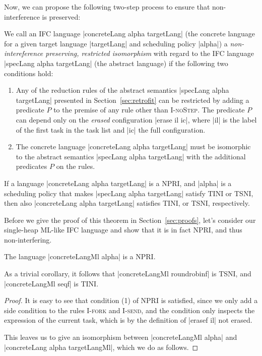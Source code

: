 Now, we can propose the following two-step process to ensure that
non-interference is preserved:
\begin{definition}
  We call an IFC language
  |concreteLang alpha targetLang| (the concrete language for a given
  target language |targetLang| and scheduling policy |alpha|)
  a \textit{non-intereference preserving,
  restricted isomorphism} with regard to the IFC language
  |specLang alpha targetLang|
  (the abstract language) if the following
  two conditions hold:
  \begin{enumerate}
    \item Any of the reduction rules of the abstract
    semantics |specLang alpha targetLang|
    presented in Section~\ref{sec:retrofit} can
    be restricted by adding a predicate $P$ to the premise of
    any rule other than \textsc{I-noStep}.  The predicate $P$
    can depend only on the \textit{erased} configuration
    |erase il ic|, where |il| is the label of the first task
    in the task list and |ic| the full configuration.
    \item The concrete language
    |concreteLang alpha targetLang|
    must be isomorphic to the abstract semantics |specLang alpha targetLang|
    with the additional predicates $P$ on the rules.
  \end{enumerate}
\end{definition}

\begin{theorem}
  \label{thm:npri}
  If a language |concreteLang alpha targetLang| is a NPRI, and |alpha|
  is a scheduling policy that makes |specLang alpha targetLang| satisfy
  TINI or TSNI, then also
  |concreteLang alpha targetLang| satisfies TINI, or TSNI, respectively.
\end{theorem}

Before we give the proof of this theorem in Section~\ref{sec:proofs},
let's consider our single-heap ML-like IFC language and
show that it is in fact NPRI, and thus non-interfering.

\begin{theorem}
  The language |concreteLangMl alpha| is a NPRI.
\end{theorem}
As a trivial corollary, it follows that |concreteLangMl roundrobinf| is
TSNI, and |concreteLangMl seqf| is TINI.

\begin{proof}
  It is easy to see that condition (1) of NPRI is satisfied, since
  we only add a side condition to the rules \textsc{I-fork} and
  \textsc{I-send}, and the condition only inspects the expression
  of the current task, which is by the definition of |erasef il| not
  erased.
  
  This leaves us to give an isomorphism between |concreteLangMl alpha|
  and |concreteLang alpha targetLangMl|, which we do as follows.
\end{proof}


